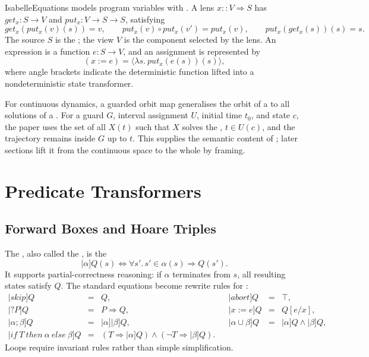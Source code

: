 \documentclass[hidelinks]{article}
\begin{document}
\begin{smodule}[title={IsaVODEs: Interactive Verification of Cyber-Physical Systems at Scale}]{IsabelleEquations}
 models program variables with .
A lens \(x::V\Rightarrow S\) has \(get_x:S\to V\) and \(put_x:V\to S\to S\), satisfying
\[
    get_x(put_x(v)(s))=v,\qquad
    put_x(v)\circ put_x(v')=put_x(v),\qquad
    put_x(get_x(s))(s)=s.
\]
The source \(S\) is the ; the view \(V\) is the component selected by the lens.
An expression is a function \(e:S\to V\), and an assignment is represented by
\[
    (x:=e)=\langle \lambda s.\ put_x(e(s))(s)\rangle,
\]
where angle brackets indicate the deterministic function lifted into a nondeterministic state transformer.

For continuous dynamics, a guarded orbit map generalises the orbit of a  to all solutions of a .
For a guard \(G\), interval assignment \(U\), initial time \(t_0\), and state \(c\), the paper uses the set of all \(X(t)\) such that \(X\) solves the , \(t\in U(c)\), and the trajectory remains inside \(G\) up to \(t\).
This supplies the semantic content of ; later sections lift it from the continuous space to the whole  by framing.

\section{Predicate Transformers}

\subsection{Forward Boxes and Hoare Triples}

The , also called the , is the 
\[
    |\alpha]Q(s) \Longleftrightarrow
    \forall s'.\, s'\in\alpha(s)\Longrightarrow Q(s').
\]
It supports partial-correctness reasoning: if \(\alpha\) terminates from \(s\), all resulting states satisfy \(Q\).
The standard equations become rewrite rules for :
\[
\begin{array}{rclcrcl}
|skip]Q &=& Q, &&
|abort]Q &=& \top,\\
|?P]Q &=& P\Longrightarrow Q, &&
|x:=e]Q &=& Q[e/x],\\
|\alpha;\beta]Q &=& |\alpha]|\beta]Q, &&
|\alpha\cup\beta]Q &=& |\alpha]Q\wedge|\beta]Q,\\
|if\ T\ then\ \alpha\ else\ \beta]Q
&=& (T\Longrightarrow|\alpha]Q)\wedge(\neg T\Longrightarrow|\beta]Q).
\end{array}
\]
Loops require invariant rules rather than simple simplification.


\end{smodule}
\end{document}
